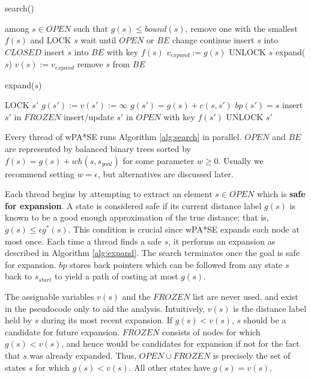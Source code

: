 \documentclass[letterpaper]{article}
\begin{document}
\begin{algorithm}
\caption{search()}
\label{alg:search}
\begin{algorithmic}
\STATE among $s\in OPEN$ such that $g(s) \le bound(s)$, remove one with the smallest $f(s)$ and LOCK $s$
\STATE wait until $OPEN$ or $BE$ change
\STATE continue
\ENDIF
\STATE insert $s$ into $CLOSED$
\STATE insert $s$ into $BE$ with key $f(s)$
\STATE $v_{expand} := g(s)$
\STATE UNLOCK $s$
\STATE expand($s$)
\STATE $v(s) := v_{expand}$
\STATE remove $s$ from $BE$
\ENDWHILE
\end{algorithmic}
\end{algorithm}

\begin{algorithm}
\caption{expand($s$)}
\label{alg:expand}
\begin{algorithmic}
\STATE LOCK $s'$
\STATE $g(s') := v(s') := \infty$
\ENDIF
{}
\STATE $g(s') = g(s) + c(s,s')$
\STATE $bp(s') = s$
\STATE insert $s'$ in $FROZEN$
\ELSE
\STATE insert/update $s'$ in $OPEN$ with key $f(s')$
\ENDIF
\ENDIF
\STATE UNLOCK $s'$
\ENDFOR
\end{algorithmic}
\end{algorithm}

Every thread of wPA*SE runs Algorithm \ref{alg:search} in parallel. $OPEN$ and $BE$ are represented by balanced binary trees sorted by $f(s) = g(s) + wh(s,s_{goal})$ for some parameter $w\ge 0$. Usually we recommend setting $w=\epsilon$, but alternatives are discussed later.

Each thread begins by attempting to extract an element $s\in OPEN$ which is \textbf{safe for expansion}. A state is considered safe if its current distance label $g(s)$ is known to be a good enough approximation of the true distance; that is, $g(s) \le \epsilon g^*(s)$. This condition is crucial since wPA*SE expands each node at most once. Each time a thread finds a safe $s$, it performs an expansion as described in Algorithm \ref{alg:expand}. The search terminates once the goal is safe for expansion. $bp$ stores back pointers which can be followed from any state $s$ back to $s_{start}$ to yield a path of costing at most $g(s)$.

The assignable variables $v(s)$ and the $FROZEN$ list are never used, and exist in the pseudocode only to aid the analysis. Intuitively, $v(s)$ is the distance label held by $s$ during its most recent expansion. If $g(s) < v(s)$, $s$ should be a candidate for future expansion. $FROZEN$ consists of nodes for which $g(s) < v(s)$, and hence would be candidates for expansion if not for the fact that $s$ was already expanded. Thus, $OPEN\cup FROZEN$ is precisely the set of states $s$ for which $g(s) < v(s)$. All other states have $g(s) = v(s)$.
\end{document}
